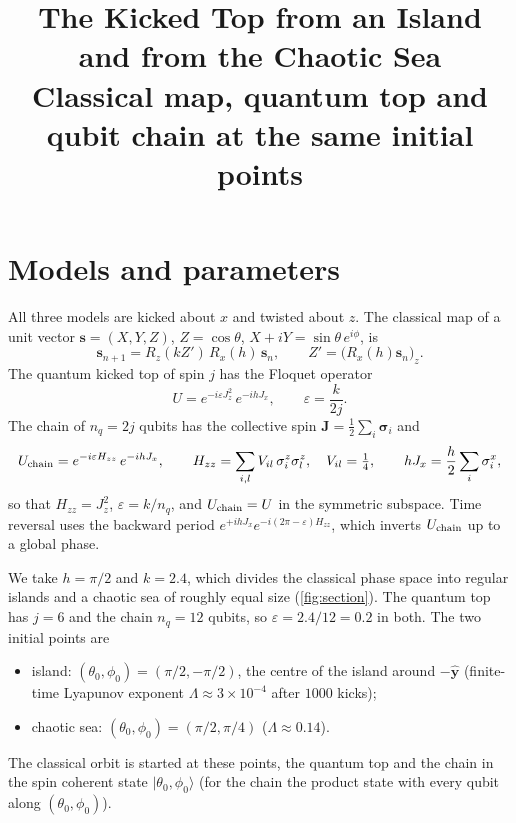 \documentclass[11pt,a4paper]{article}
\title{The Kicked Top from an Island and from the Chaotic Sea\\[0.3em]
  \large Classical map, quantum top and qubit chain at the same initial points}
\author{}
\date{}
\begin{document}
\maketitle

\section{Models and parameters}

All three models are kicked about $x$ and twisted about $z$. The classical map of a unit vector $\bm s=(X,Y,Z)$,
$Z=\cos\theta$, $X+iY=\sin\theta\,e^{i\phi}$, is
\begin{equation}
  \bm s_{n+1} = R_z(kZ')\,R_x(h)\,\bm s_n,\qquad Z'=\big(R_x(h)\bm s_n\big)_z .
\end{equation}
The quantum kicked top of spin $j$ has the Floquet operator
\begin{equation}
  U = e^{-i\varepsilon J_z^2}\,e^{-ihJ_x},\qquad \varepsilon = \frac{k}{2j}.
\end{equation}
The chain of $n_q=2j$ qubits has the collective spin $\bm J=\frac12\sum_i\bm\sigma_i$ and
\begin{equation}
  U_{\rm chain} = e^{-i\varepsilon H_{zz}}\,e^{-ih J_x},\qquad H_{zz}=\sum_{i,l}V_{il}\,\sigma^z_i\sigma^z_l,\quad
  V_{il}=\tfrac14,\qquad hJ_x = \frac h2\sum_i\sigma^x_i ,
\end{equation}
so that $H_{zz}=J_z^2$, $\varepsilon = k/n_q$, and $U_{\rm chain}=U$ in the symmetric subspace. Time reversal uses the
backward period $e^{+ihJ_x}e^{-i(2\pi-\varepsilon)H_{zz}}$, which inverts $U_{\rm chain}$ up to a global phase.

We take $h=\pi/2$ and $k=2.4$, which divides the classical phase space into regular islands and a chaotic sea of
roughly equal size (\cref{fig:section}). The quantum top has $j=6$ and the chain $n_q=12$ qubits, so
$\varepsilon = 2.4/12 = 0.2$ in both. The two initial points are
\begin{itemize}
  \item island: $(\theta_0,\phi_0)=(\pi/2,-\pi/2)$, the centre of the island around $-\hat{\bm y}$ (finite-time
  Lyapunov exponent $\Lambda\approx3\times10^{-4}$ after $1000$ kicks);
  \item chaotic sea: $(\theta_0,\phi_0)=(\pi/2,\pi/4)$ ($\Lambda\approx0.14$).
\end{itemize}
The classical orbit is started at these points, the quantum top and the chain in the spin coherent state
$|\theta_0,\phi_0\rangle$ (for the chain the product state with every qubit along $(\theta_0,\phi_0)$).
\end{document}
